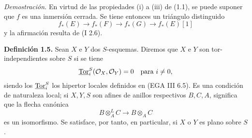 \emph{Demostración.} En virtud de las propiedades (i) a (iii) de (1.1), se puede suponer que \(f\) es una inmersión cerrada. Se tiene entonces un triángulo distinguido
\[
f_*(E)\longrightarrow f_*(F)\longrightarrow f_*(G)\longrightarrow f_*(E)[1]
\]
y la afirmación resulta de (I 2.6).

\textbf{Definición 1.5.} Sean \(X\) e \(Y\) dos \(S\)-esquemas. Diremos que \(X\) e \(Y\) son tor-independientes sobre \(S\) si se tiene
\[
 \underline{\operatorname{Tor}}_i^S(\mathcal O_X,\mathcal O_Y)=0\quad\text{para }i\ne 0,
\]
siendo los \(\underline{\operatorname{Tor}}_i^S\) los hipertor locales definidos en (EGA III 6.5). Es una condición de naturaleza local; si \(X,Y,S\) son afines de anillos respectivos \(B,C,A\), significa que la flecha canónica
\[
 B\otimes_A^{L}C\longrightarrow B\otimes_A C
\]
es un isomorfismo. Se satisface, por tanto, en particular, si \(X\) o \(Y\) es plano sobre \(S\).
